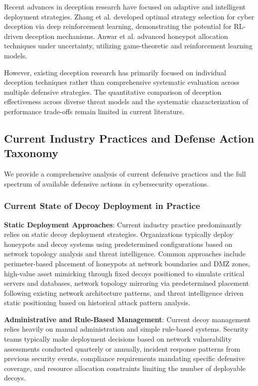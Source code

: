 \documentclass[12pt,oneside]{article}
\begin{document}
Recent advances in deception research have focused on adaptive and intelligent deployment strategies. Zhang et al. \cite{zhang2022optimal} developed optimal strategy selection for cyber deception via deep reinforcement learning, demonstrating the potential for RL-driven deception mechanisms. Anwar et al. \cite{anwar2022honeypot} advanced honeypot allocation techniques under uncertainty, utilizing game-theoretic and reinforcement learning models.

However, existing deception research has primarily focused on individual deception techniques rather than comprehensive systematic evaluation across multiple defensive strategies. The quantitative comparison of deception effectiveness across diverse threat models and the systematic characterization of performance trade-offs remain limited in current literature.

\subsection{Current Industry Practices and Defense Action Taxonomy}

We provide a comprehensive analysis of current defensive practices and the full spectrum of available defensive actions in cybersecurity operations.

\subsubsection{Current State of Decoy Deployment in Practice}

\textbf{Static Deployment Approaches}: Current industry practice predominantly relies on static decoy deployment strategies. Organizations typically deploy honeypots and decoy systems using predetermined configurations based on network topology analysis and threat intelligence. Common approaches include perimeter-based placement of honeypots at network boundaries and DMZ zones, high-value asset mimicking through fixed decoys positioned to simulate critical servers and databases, network topology mirroring via predetermined placement following existing network architecture patterns, and threat intelligence driven static positioning based on historical attack pattern analysis.

\textbf{Administrative and Rule-Based Management}: Current decoy management relies heavily on manual administration and simple rule-based systems. Security teams typically make deployment decisions based on network vulnerability assessments conducted quarterly or annually, incident response patterns from previous security events, compliance requirements mandating specific defensive coverage, and resource allocation constraints limiting the number of deployable decoys.
\end{document}
